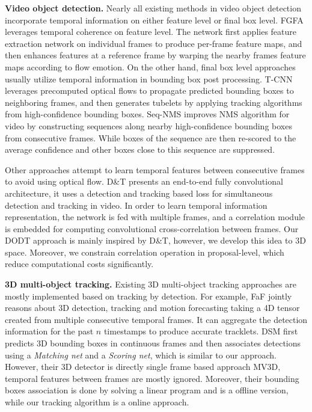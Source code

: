 \documentclass[letterpaper, 10 pt, conference]{ieeeconf}  %
\begin{document}
\textbf{Video object detection.} Nearly all existing methods in video object detection incorporate temporal information on either feature level or final box level. FGFA \cite{zhu2017flow} leverages temporal coherence on feature level. The network first applies feature extraction network on individual frames to produce per-frame feature maps, and then enhances features at a reference frame by warping the nearby frames feature maps according to flow emotion. On the other hand, final box level approaches usually utilize temporal information in bounding box post processing. T-CNN \cite{kang2018t, kang2016object} leverages precomputed optical flows to propagate predicted bounding boxes to neighboring frames, and then generates tubelets by applying tracking algorithms from high-confidence bounding boxes. Seq-NMS \cite{han2016seq} improves NMS algorithm for video by constructing sequences along nearby high-confidence bounding boxes from consecutive frames. While boxes of the sequence are then re-scored to the average confidence and other boxes close to this sequence are suppressed. 

Other approaches attempt to learn temporal features between consecutive frames to avoid using optical flow. D\&T \cite{feichtenhofer2017detect} presents an end-to-end fully convolutional architecture, it uses a detection and tracking based loss for simultaneous detection and tracking in video. In order to learn temporal information representation, the network is fed with multiple frames, and a correlation module is embedded for computing convolutional cross-correlation between frames. Our DODT approach is mainly inspired by D\&T, however, we develop this idea to 3D space. Moreover, we constrain correlation operation in proposal-level, which reduce computational costs significantly. 

\textbf{3D multi-object tracking.} Existing 3D multi-object tracking approaches are mostly implemented based on tracking by detection. For example, FaF \cite{luo2018fast} jointly reasons about 3D detection, tracking and motion forecasting taking a 4D tensor created from multiple consecutive temporal frames. It can aggregate the detection information for the past $n$ timestamps to produce accurate tracklets. DSM \cite{frossard2018end} first predicts 3D bounding boxes in continuous frames and then associates detections using a \textit{Matching net} and a \textit{Scoring net}, which is similar to our approach. However, their 3D detector is directly single frame based approach MV3D\cite{chen2017multi}, temporal features between frames are mostly ignored. Moreover, their bounding boxes association is done by solving a linear program and is a offline version, while our tracking algorithm is a online approach.
\end{document}
